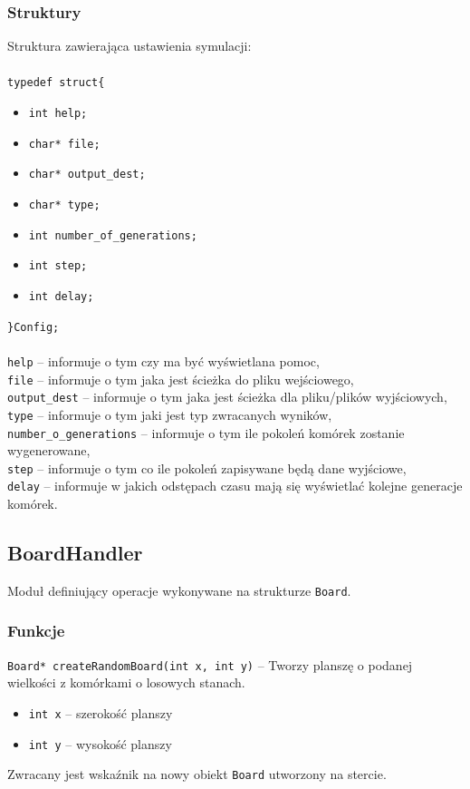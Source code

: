 \documentclass{article}
\begin{document}
\subsubsection{Struktury}
Struktura zawierająca ustawienia symulacji: \\\\
\texttt{typedef struct\{}
\begin{itemize}[label={}, noitemsep, topsep=0pt]
	\item \texttt{int help;}
	\item \texttt{char* file;}
	\item \texttt{char* output\_dest;}
	\item \texttt{char* type;}
	\item \texttt{int number\_of\_generations;}
	\item \texttt{int step;}
	\item \texttt{int delay;}
\end{itemize}
\texttt{\}Config;}
\\\\
\texttt{help} -- informuje o tym czy ma być wyświetlana pomoc,\\
\texttt{file} -- informuje o tym jaka jest ścieżka do pliku wejściowego,\\
\texttt{output\_dest} --  informuje o tym jaka jest ścieżka dla pliku/plików wyjściowych,\\
\texttt{type} -- informuje o tym jaki jest typ zwracanych wyników,\\
\texttt{number\_o\_generations} -- informuje o tym ile pokoleń komórek zostanie wygenerowane,\\
\texttt{step} -- informuje o tym co ile pokoleń zapisywane będą dane wyjściowe,\\
\texttt{delay} -- informuje w jakich odstępach czasu mają się wyświetlać kolejne generacje komórek.\\

\subsection{BoardHandler}
Moduł definiujący operacje wykonywane na strukturze \texttt{Board}.

\subsubsection{Funkcje}

\texttt{Board* createRandomBoard(int x, int y)} -- Tworzy planszę o podanej wielkości z komórkami o losowych stanach.
\begin{itemize}[label={}]
	\item \texttt{int x} -- szerokość planszy
	\item \texttt{int y} -- wysokość planszy
\end{itemize}
Zwracany jest wskaźnik na nowy obiekt \texttt{Board} utworzony na stercie.
\end{document}
